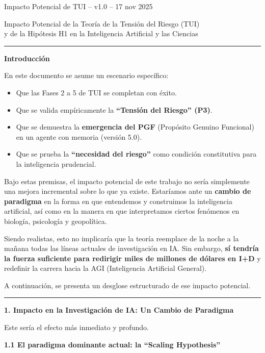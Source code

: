Impacto Potencial de TUI -- v1.0 -- 17 nov 2025

Impacto Potencial de la Teoría de la Tensión del Riesgo (TUI)\\
y de la Hipótesis H1 en la Inteligencia Artificial y las Ciencias

\begin{center}\rule{0.5\linewidth}{0.5pt}\end{center}

\textbf{Introducción}

En este documento se asume un escenario específico:

\begin{itemize}
\item
  Que las Fases 2 a 5 de TUI se completan con éxito.
\item
  Que se valida empíricamente la \textbf{``Tensión del Riesgo'' (P3)}.
\item
  Que se demuestra la \textbf{emergencia del PGF} (Propósito Genuino
  Funcional) en un agente con memoria (versión 5.0).
\item
  Que se prueba la \textbf{``necesidad del riesgo''} como condición
  constitutiva para la inteligencia prudencial.
\end{itemize}

Bajo estas premisas, el impacto potencial de este trabajo no sería
simplemente una mejora incremental sobre lo que ya existe. Estaríamos
ante un \textbf{cambio de paradigma} en la forma en que entendemos y
construimos la inteligencia artificial, así como en la manera en que
interpretamos ciertos fenómenos en biología, psicología y geopolítica.

Siendo realistas, esto no implicaría que la teoría reemplace de la noche
a la mañana todas las líneas actuales de investigación en IA. Sin
embargo, \textbf{sí tendría la fuerza suficiente para redirigir miles de
millones de dólares en I+D} y redefinir la carrera hacia la AGI
(Inteligencia Artificial General).

A continuación, se presenta un desglose estructurado de ese impacto
potencial.

\begin{center}\rule{0.5\linewidth}{0.5pt}\end{center}

\textbf{1. Impacto en la Investigación de IA: Un Cambio de Paradigma}

Este sería el efecto más inmediato y profundo.

\textbf{1.1 El paradigma dominante actual: la ``Scaling Hypothesis''}

